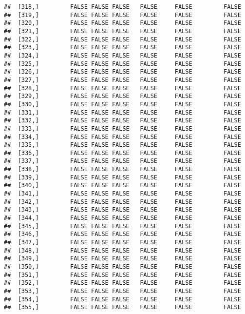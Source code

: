 \documentclass[
]{article}
\begin{document}
\begin{verbatim}
##  [318,]         FALSE FALSE FALSE   FALSE     FALSE         FALSE
##  [319,]         FALSE FALSE FALSE   FALSE     FALSE         FALSE
##  [320,]         FALSE FALSE FALSE   FALSE     FALSE         FALSE
##  [321,]         FALSE FALSE FALSE   FALSE     FALSE         FALSE
##  [322,]         FALSE FALSE FALSE   FALSE     FALSE         FALSE
##  [323,]         FALSE FALSE FALSE   FALSE     FALSE         FALSE
##  [324,]         FALSE FALSE FALSE   FALSE     FALSE         FALSE
##  [325,]         FALSE FALSE FALSE   FALSE     FALSE         FALSE
##  [326,]         FALSE FALSE FALSE   FALSE     FALSE         FALSE
##  [327,]         FALSE FALSE FALSE   FALSE     FALSE         FALSE
##  [328,]         FALSE FALSE FALSE   FALSE     FALSE         FALSE
##  [329,]         FALSE FALSE FALSE   FALSE     FALSE         FALSE
##  [330,]         FALSE FALSE FALSE   FALSE     FALSE         FALSE
##  [331,]         FALSE FALSE FALSE   FALSE     FALSE         FALSE
##  [332,]         FALSE FALSE FALSE   FALSE     FALSE         FALSE
##  [333,]         FALSE FALSE FALSE   FALSE     FALSE         FALSE
##  [334,]         FALSE FALSE FALSE   FALSE     FALSE         FALSE
##  [335,]         FALSE FALSE FALSE   FALSE     FALSE         FALSE
##  [336,]         FALSE FALSE FALSE   FALSE     FALSE         FALSE
##  [337,]         FALSE FALSE FALSE   FALSE     FALSE         FALSE
##  [338,]         FALSE FALSE FALSE   FALSE     FALSE         FALSE
##  [339,]         FALSE FALSE FALSE   FALSE     FALSE         FALSE
##  [340,]         FALSE FALSE FALSE   FALSE     FALSE         FALSE
##  [341,]         FALSE FALSE FALSE   FALSE     FALSE         FALSE
##  [342,]         FALSE FALSE FALSE   FALSE     FALSE         FALSE
##  [343,]         FALSE FALSE FALSE   FALSE     FALSE         FALSE
##  [344,]         FALSE FALSE FALSE   FALSE     FALSE         FALSE
##  [345,]         FALSE FALSE FALSE   FALSE     FALSE         FALSE
##  [346,]         FALSE FALSE FALSE   FALSE     FALSE         FALSE
##  [347,]         FALSE FALSE FALSE   FALSE     FALSE         FALSE
##  [348,]         FALSE FALSE FALSE   FALSE     FALSE         FALSE
##  [349,]         FALSE FALSE FALSE   FALSE     FALSE         FALSE
##  [350,]         FALSE FALSE FALSE   FALSE     FALSE         FALSE
##  [351,]         FALSE FALSE FALSE   FALSE     FALSE         FALSE
##  [352,]         FALSE FALSE FALSE   FALSE     FALSE         FALSE
##  [353,]         FALSE FALSE FALSE   FALSE     FALSE         FALSE
##  [354,]         FALSE FALSE FALSE   FALSE     FALSE         FALSE
##  [355,]         FALSE FALSE FALSE   FALSE     FALSE         FALSE

\end{verbatim}
\end{document}
